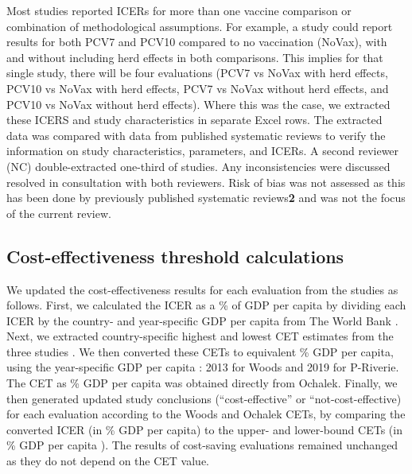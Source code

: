\documentclass[12pt]{article}
\begin{document}
Most studies reported ICERs for more than one vaccine comparison or combination of methodological assumptions. For example, a study could report results for both PCV7 and PCV10 compared to no vaccination (NoVax), with and without including herd effects in both comparisons. This implies for that single study, there will be four evaluations (PCV7 vs NoVax with herd effects, PCV10 vs NoVax with herd effects, PCV7 vs NoVax without herd effects, and PCV10 vs NoVax without herd effects). Where this was the case, we extracted these ICERS and study characteristics in separate Excel rows. The extracted data was compared with data from published systematic reviews\autocite{saokaew_cost_2016, syeed_pneumococcal_2023, wang_systematic_2022, zakiyah_pneumococcal_2020} to verify the information on study characteristics, parameters, and ICERs. A second reviewer (NC) double-extracted one-third of studies. Any inconsistencies were discussed resolved in consultation with both reviewers. Risk of bias was not assessed as this has been done by previously published systematic reviews\textbf{2} and was not the focus of the current review.

\subsection{Cost-effectiveness threshold calculations}
We updated the cost-effectiveness results for each evaluation from the studies as follows. First, we calculated the ICER as a \% of GDP per capita by dividing each ICER by the country- and year-specific GDP per capita from The World Bank \autocite{the_world_bank_gdp_2023}. Next, we extracted country-specific highest and lowest CET estimates from the three studies \autocite{woods_country-level_2016, ochalek_estimating_2018, pichon-riviere_determining_2023}. We then converted these CETs to equivalent \% GDP per capita, using the year-specific GDP per capita \autocite{the_world_bank_gdp_2023}: 2013 for Woods\autocite{woods_country-level_2016} and 2019 for P-Riverie\autocite{pichon-riviere_determining_2023}. The CET as \% GDP per capita was obtained directly from Ochalek\autocite{ochalek_estimating_2018}. Finally, we then generated updated study conclusions (“cost-effective” or “not-cost-effective) for each evaluation according to the Woods and Ochalek CETs, by comparing the converted ICER (in \% GDP per capita) to the upper- and lower-bound CETs (in \% GDP per capita ). The results of cost-saving evaluations remained unchanged as they do not depend on the CET value.
 
\end{document}
